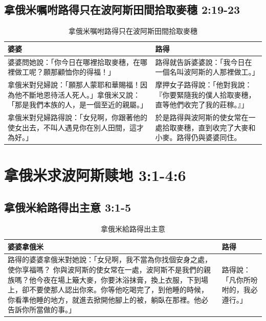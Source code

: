 \subsection{拿俄米嘱咐路得只在波阿斯田間拾取麥穗 2:19-23}
\begin{table}[H]
\centering
\begin{tabular}{p{}|p{8.5cm}}\hline
婆婆&路得\\\hline
婆婆問她說：「你今日在哪裡拾取麥穗，在哪裡做工呢？願那顧恤你的得福！」
&路得就告訴婆婆說：「我今日在一個名叫波阿斯的人那裡做工。」  \\\hline
拿俄米對兒婦說：「願那人蒙耶和華賜福！因為他不斷地恩待活人死人。」拿俄米又說：「那是我們本族的人，是一個至近的親屬。」&摩押女子路得說：「他對我說：『你要緊隨我的僕人拾取麥穗，直等他們收完了我的莊稼。』」 \\\hline
拿俄米對兒婦路得說：「女兒啊，你跟著他的使女出去，不叫人遇見你在別人田間，這才為好。」&
於是路得與波阿斯的使女常在一處拾取麥穗，直到收完了大麥和小麥。路得仍與婆婆同住。\\\hline
\end{tabular}
\caption{拿俄米嘱咐路得只在波阿斯田間拾取麥穗}
\end{table} 


 

\section{拿俄米求波阿斯赎地 3:1-4:6}
\subsection{拿俄米給路得出主意 3:1-5 }
\begin{table}[H]
\centering
\begin{tabular}{p{15.5cm}|p{1.7cm}}\hline
婆婆拿俄米&路得\\\hline
路得的婆婆拿俄米對她說：「女兒啊，我不當為你找個安身之處，使你享福嗎？ 你與波阿斯的使女常在一處，波阿斯不是我們的親族嗎？他今夜在場上簸大麥，你要沐浴抹膏，換上衣服，下到場上，卻不要使那人認出你來。你等他吃喝完了，到他睡的時候，你看準他睡的地方，就進去掀開他腳上的被，躺臥在那裡。他必告訴你所當做的事。」 &路得說：「凡你所吩咐的，我必遵行。」\\\hline
\end{tabular}
\caption{拿俄米給路得出主意}
\end{table} 

